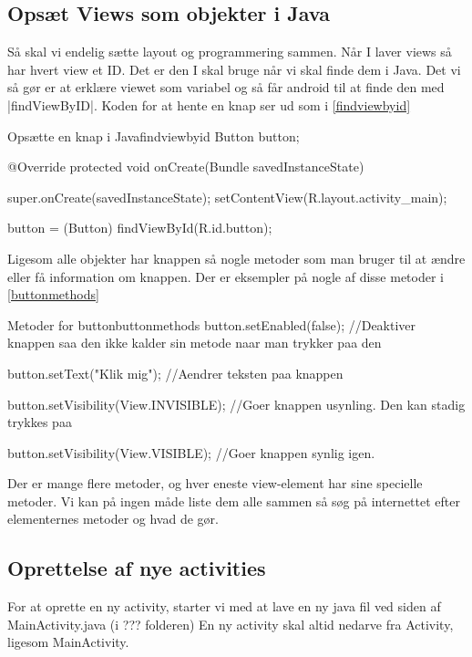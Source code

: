 \subsection{Opsæt Views som objekter i Java}
Så skal vi endelig sætte layout og programmering sammen. Når I laver views så har hvert view et ID. Det er den I skal bruge når vi skal finde dem i Java. Det vi så gør er at erklære viewet som variabel og så får android til at finde den med \JavaInline|findViewByID|. Koden for at hente en knap ser ud som i \autoref{findviewbyid}

\begin{JavaCode}{Opsætte en knap i Java}{findviewbyid}
	Button button;
	
	@Override
	protected void onCreate(Bundle savedInstanceState) {
		super.onCreate(savedInstanceState);
		setContentView(R.layout.activity_main);
		
		button = (Button) findViewById(R.id.button);
	}
\end{JavaCode}

Ligesom alle objekter har knappen så nogle metoder som man bruger til at ændre eller få information om knappen. Der er eksempler på nogle af disse metoder i \autoref{buttonmethods}
\begin{JavaCode}{Metoder for button}{buttonmethods}
	button.setEnabled(false);
	//Deaktiver knappen saa den ikke kalder sin metode naar man trykker paa den
	
	button.setText("Klik mig");
	//Aendrer teksten paa knappen 
	
    button.setVisibility(View.INVISIBLE);
    //Goer knappen usynling. Den kan stadig trykkes paa
    
    button.setVisibility(View.VISIBLE);
    //Goer knappen synlig igen.
	
\end{JavaCode}
Der er mange flere metoder, og hver eneste view-element har sine specielle metoder. Vi kan på ingen måde liste dem alle sammen så søg på internettet efter elementernes metoder og hvad de gør. 


\subsection{Oprettelse af nye activities}

For at oprette en ny activity, starter vi med at lave en ny java fil ved siden af MainActivity.java (i ??? folderen) En ny activity skal altid nedarve fra Activity, ligesom MainActivity. 

